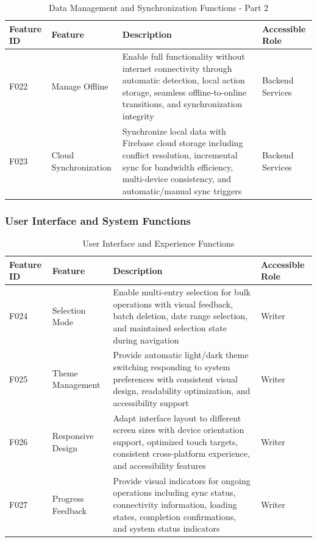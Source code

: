 \begin{table}[H]
\centering
\caption{Data Management and Synchronization Functions - Part 2}
\label{tab:data-management-functions-2}
\begin{tabular}{|p{0.8cm}|p{2.2cm}|p{9.5cm}|p{1.5cm}|}
\hline
\textbf{Feature ID} & \textbf{Feature} & \textbf{Description} & \textbf{Accessible Role} \\
\hline
F022 & Manage Offline & Enable full functionality without internet connectivity through automatic detection, local action storage, seamless offline-to-online transitions, and synchronization integrity & Backend Services \\
\hline
F023 & Cloud Synchronization & Synchronize local data with Firebase cloud storage including conflict resolution, incremental sync for bandwidth efficiency, multi-device consistency, and automatic/manual sync triggers & Backend Services \\
\hline
\end{tabular}
\end{table}

\subsubsection{User Interface and System Functions}

\begin{table}[H]
\centering
\caption{User Interface and Experience Functions}
\label{tab:ui-ux-functions}
\begin{tabular}{|p{0.8cm}|p{2.2cm}|p{9.5cm}|p{1.5cm}|}
\hline
\textbf{Feature ID} & \textbf{Feature} & \textbf{Description} & \textbf{Accessible Role} \\
\hline
F024 & Selection Mode & Enable multi-entry selection for bulk operations with visual feedback, batch deletion, date range selection, and maintained selection state during navigation & Writer \\
\hline
F025 & Theme Management & Provide automatic light/dark theme switching responding to system preferences with consistent visual design, readability optimization, and accessibility support & Writer \\
\hline
F026 & Responsive Design & Adapt interface layout to different screen sizes with device orientation support, optimized touch targets, consistent cross-platform experience, and accessibility features & Writer \\
\hline
F027 & Progress Feedback & Provide visual indicators for ongoing operations including sync status, connectivity information, loading states, completion confirmations, and system status indicators & Writer \\
\hline
\end{tabular}
\end{table}


